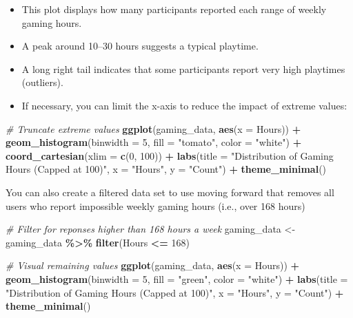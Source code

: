 \documentclass[
]{book}
\newenvironment{Shaded}{\begin{snugshade}}{\end{snugshade}}
\newcommand{\AttributeTok}[1]{\textcolor[rgb]{0.13,0.29,0.53}{#1}}
\newcommand{\CommentTok}[1]{\textcolor[rgb]{0.56,0.35,0.01}{\textit{#1}}}
\newcommand{\DecValTok}[1]{\textcolor[rgb]{0.00,0.00,0.81}{#1}}
\newcommand{\FunctionTok}[1]{\textcolor[rgb]{0.13,0.29,0.53}{\textbf{#1}}}
\newcommand{\NormalTok}[1]{#1}
\newcommand{\OtherTok}[1]{\textcolor[rgb]{0.56,0.35,0.01}{#1}}
\newcommand{\SpecialCharTok}[1]{\textcolor[rgb]{0.81,0.36,0.00}{\textbf{#1}}}
\newcommand{\StringTok}[1]{\textcolor[rgb]{0.31,0.60,0.02}{#1}}
\providecommand{\tightlist}{%
  \setlength{\itemsep}{0pt}\setlength{\parskip}{0pt}}
\begin{document}
\begin{itemize}
\tightlist
\item
  This plot displays how many participants reported each range of weekly gaming hours.
\item
  A peak around 10--30 hours suggests a typical playtime.
\item
  A long right tail indicates that some participants report very high playtimes (outliers).
\item
  If necessary, you can limit the x-axis to reduce the impact of extreme values:
\end{itemize}

\begin{Shaded}
\begin{Highlighting}[]
\CommentTok{\# Truncate extreme values}
\FunctionTok{ggplot}\NormalTok{(gaming\_data, }\FunctionTok{aes}\NormalTok{(}\AttributeTok{x =}\NormalTok{ Hours)) }\SpecialCharTok{+}
  \FunctionTok{geom\_histogram}\NormalTok{(}\AttributeTok{binwidth =} \DecValTok{5}\NormalTok{, }\AttributeTok{fill =} \StringTok{"tomato"}\NormalTok{, }\AttributeTok{color =} \StringTok{"white"}\NormalTok{) }\SpecialCharTok{+}
  \FunctionTok{coord\_cartesian}\NormalTok{(}\AttributeTok{xlim =} \FunctionTok{c}\NormalTok{(}\DecValTok{0}\NormalTok{, }\DecValTok{100}\NormalTok{)) }\SpecialCharTok{+}
  \FunctionTok{labs}\NormalTok{(}\AttributeTok{title =} \StringTok{"Distribution of Gaming Hours (Capped at 100)"}\NormalTok{, }\AttributeTok{x =} \StringTok{"Hours"}\NormalTok{, }\AttributeTok{y =} \StringTok{"Count"}\NormalTok{) }\SpecialCharTok{+}
  \FunctionTok{theme\_minimal}\NormalTok{()}
\end{Highlighting}
\end{Shaded}

You can also create a filtered data set to use moving forward that removes all users who report impossible weekly gaming hours (i.e., over 168 hours)

\begin{Shaded}
\begin{Highlighting}[]
\CommentTok{\# Filter for reponses higher than 168 hours a week}
\NormalTok{gaming\_data }\OtherTok{\textless{}{-}}\NormalTok{ gaming\_data }\SpecialCharTok{\%\textgreater{}\%}
  \FunctionTok{filter}\NormalTok{(Hours }\SpecialCharTok{\textless{}=} \DecValTok{168}\NormalTok{)}

\CommentTok{\# Visual remaining values}
\FunctionTok{ggplot}\NormalTok{(gaming\_data, }\FunctionTok{aes}\NormalTok{(}\AttributeTok{x =}\NormalTok{ Hours)) }\SpecialCharTok{+}
  \FunctionTok{geom\_histogram}\NormalTok{(}\AttributeTok{binwidth =} \DecValTok{5}\NormalTok{, }\AttributeTok{fill =} \StringTok{"green"}\NormalTok{, }\AttributeTok{color =} \StringTok{"white"}\NormalTok{) }\SpecialCharTok{+}
  \FunctionTok{labs}\NormalTok{(}\AttributeTok{title =} \StringTok{"Distribution of Gaming Hours (Capped at 100)"}\NormalTok{, }\AttributeTok{x =} \StringTok{"Hours"}\NormalTok{, }\AttributeTok{y =} \StringTok{"Count"}\NormalTok{) }\SpecialCharTok{+}
  \FunctionTok{theme\_minimal}\NormalTok{()}
\end{Highlighting}
\end{Shaded}
\end{document}
